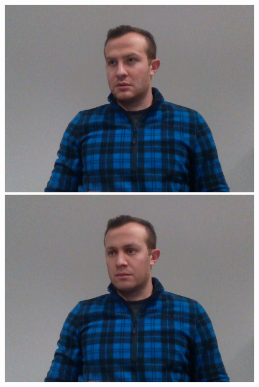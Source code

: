 \begin{figure}[h]
    \begin{minipage}{.325\textwidth}
      \centering
      \includegraphics[width=0.99\textwidth]{Figures/dataset/target/5.png}
    \end{minipage}
    \begin{minipage}{.325\textwidth}
      \centering
      \includegraphics[width=0.99\textwidth]{Figures/dataset/our/5overlay.png}
    \end{minipage}
    \begin{minipage}{.325\textwidth}
      \centering

\end{minipage}
\end{figure}
